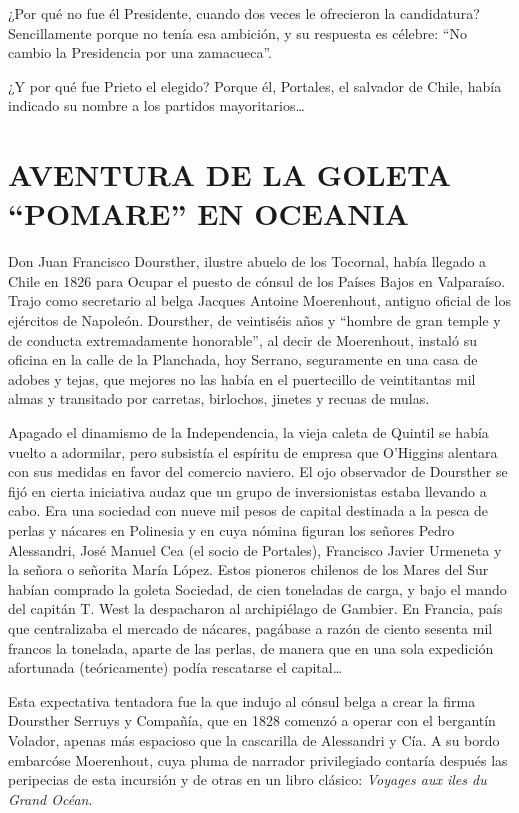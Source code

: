 \documentclass[10pt,twoside,openright]{memoir}
\begin{document}
¿Por qué no fue él Presidente, cuando dos veces le ofrecieron la
candidatura? Sencillamente porque no tenía esa ambición, y su respuesta
es célebre: ``No cambio la Presidencia por una zamacueca''.

¿Y por qué fue Prieto el elegido? Porque él, Portales, el salvador de
Chile, había indicado su nombre a los partidos mayoritarios\ldots

\chapter{AVENTURA DE LA GOLETA ``POMARE'' EN OCEANIA}

Don Juan Francisco Doursther, ilustre abuelo de los Tocornal, había
llegado a Chile en 1826 para Ocupar el puesto de cónsul de los Países
Bajos en Valparaíso. Trajo como secretario al belga Jacques Antoine
Moerenhout, antiguo oficial de los ejércitos de Napoleón. Doursther, de
veintiséis años y ``hombre de gran temple y de conducta extremadamente
honorable'', al decir de Moerenhout, instaló su oficina en la calle de la
Planchada, hoy Serrano, seguramente en una casa de adobes y tejas, que
mejores no las había en el puertecillo de veintitantas mil almas y
transitado por carretas, birlochos, jinetes y recuas de mulas.

Apagado el dinamismo de la Independencia, la vieja caleta de Quintil se
había vuelto a adormilar, pero subsistía el espíritu de empresa que
O'Higgins alentara con sus medidas en favor del comercio naviero. El ojo
observador de Doursther se fijó en cierta iniciativa audaz que un grupo
de inversionistas estaba llevando a cabo. Era una sociedad con nueve mil
pesos de capital destinada a la pesca de perlas y nácares en Polinesia y
en cuya nómina figuran los señores Pedro Alessandri, José Manuel Cea (el
socio de Portales), Francisco Javier Urmeneta y la señora o
señorita María López. Estos pioneros
chilenos de los Mares del Sur habían comprado la goleta Sociedad, de
cien toneladas de carga, y bajo el mando del capitán T. West la
despacharon al archipiélago de Gambier. En Francia, país que
centralizaba el mercado de nácares, pagábase a razón de ciento sesenta
mil francos la tonelada, aparte de las perlas, de manera que en una sola
expedición afortunada (teóricamente) podía rescatarse el capital\ldots{}

Esta expectativa tentadora fue la que indujo al cónsul belga a crear la
firma Doursther Serruys y Compañía,
que en 1828 comenzó a operar con el bergantín Volador, apenas más
espacioso que la cascarilla de Alessandri y Cía. A su bordo embarcóse
Moerenhout, cuya pluma de narrador privilegiado contaría
después las peripecias de esta
incursión y de otras en un libro
clásico: \emph{Voyages aux iles du Grand Océan}.
\end{document}
